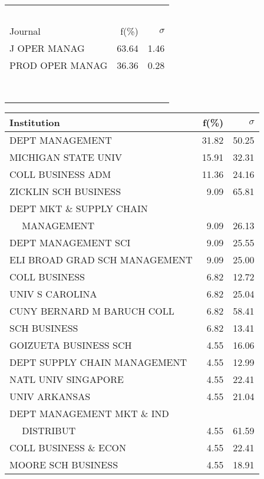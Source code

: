 \documentclass[a4paper,11pt]{report}
\begin{document}
\begin{landscape}
\begin{table}[!ht]
{\begin{tabular}{|l r  r|}
 &  & \\
 &  & \\
 &  & \\
 &  & \\
 &  & \\
\hline
\hline
Journal & f(\%) & $\sigma$\\
\hline
J OPER MANAG & 63.64 & 1.46\\
PROD OPER MANAG & 36.36 & 0.28\\
 &  & \\
 &  & \\
 &  & \\
 &  & \\
 &  & \\
 &  & \\
 &  & \\
 &  & \\
\hline
\end{tabular}
}
{\scriptsize\begin{tabular}{|l r r|}
\hline
Institution & f(\%) & $\sigma$\\
\hline
DEPT MANAGEMENT & 31.82 & 50.25\\
MICHIGAN STATE UNIV & 15.91 & 32.31\\
COLL BUSINESS ADM & 11.36 & 24.16\\
ZICKLIN SCH BUSINESS & 9.09 & 65.81\\
DEPT MKT \& SUPPLY CHAIN &  & \\
$\quad$ MANAGEMENT & 9.09 & 26.13\\
DEPT MANAGEMENT SCI & 9.09 & 25.55\\
ELI BROAD GRAD SCH MANAGEMENT & 9.09 & 25.00\\
COLL BUSINESS & 6.82 & 12.72\\
UNIV S CAROLINA & 6.82 & 25.04\\
CUNY BERNARD M BARUCH COLL & 6.82 & 58.41\\
SCH BUSINESS & 6.82 & 13.41\\
GOIZUETA BUSINESS SCH & 4.55 & 16.06\\
DEPT SUPPLY CHAIN MANAGEMENT & 4.55 & 12.99\\
NATL UNIV SINGAPORE & 4.55 & 22.41\\
UNIV ARKANSAS & 4.55 & 21.04\\
DEPT MANAGEMENT MKT \& IND &  & \\
$\quad$ DISTRIBUT & 4.55 & 61.59\\
COLL BUSINESS \& ECON & 4.55 & 22.41\\
MOORE SCH BUSINESS & 4.55 & 18.91\\

\end{tabular}}
\end{table}
\end{landscape}
\end{document}
